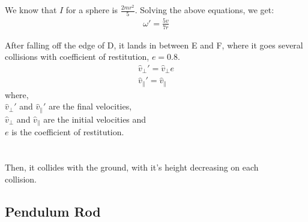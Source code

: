 \documentclass[11pt]{article}
\begin{document}
We know that $I$ for a sphere is $\frac{2mr^2}{5}$.
Solving the above equations, we get:
\begin{align}
\omega ' = \frac{5v}{7r}
\end{align}

\pagebreak

After falling off the edge of D, it lands in between E and F, where it goes several collisions with coefficient of restitution, $e = 0.8$.
\begin{align}
\hat{v}_{\perp} ' = \hat{v}_{\perp}e
\\
\hat{v}_{\parallel} ' = \hat{v}_{\parallel}
\end{align}
where,\\
$\hat{v}_{\perp} '$ and $\hat{v}_{\parallel} '$ are the final velocities,\\
$\hat{v}_{\perp}$ and $\hat{v}_{\parallel}$ are the initial velocities and\\
$e$ is the coefficient of restitution.
\\
\\
\setlength\fboxsep{2pt}
\setlength\fboxrule{1pt}
\\

Then, it collides with the ground, with it's height decreasing on each \\ collision.

\pagebreak

\subsection{Pendulum Rod}
\end{document}
